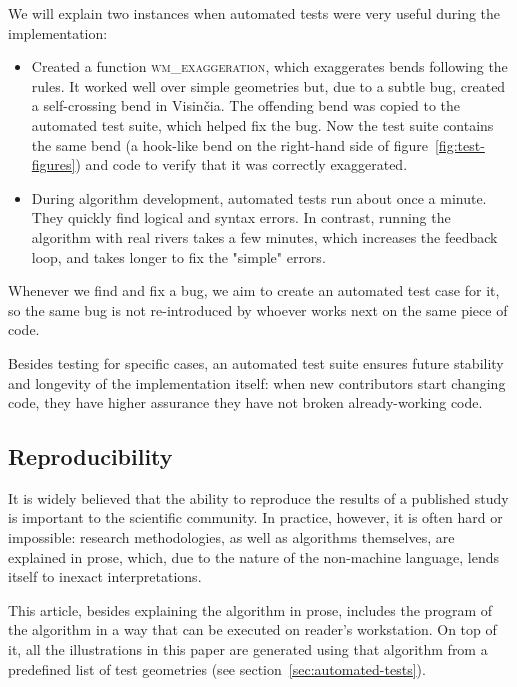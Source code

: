 \documentclass[a4paper]{article}
\begin{document}
We will explain two instances when automated tests were very useful during
the implementation:
\begin{itemize}

    \item Created a function \textsc{wm\_exaggeration}, which exaggerates bends
        following the rules. It worked well over simple geometries but, due to
        a subtle bug, created a self-crossing bend in Visinčia. The offending
        bend was copied to the automated test suite, which helped fix the bug.
        Now the test suite contains the same bend (a hook-like bend on the
        right-hand side of figure~\ref{fig:test-figures}) and code to verify
        that it was correctly exaggerated.

    \item During algorithm development, automated tests run about once a
        minute. They quickly find logical and syntax errors. In contrast,
        running the algorithm with real rivers takes a few minutes, which
        increases the feedback loop, and takes longer to fix the "simple"
        errors.

\end{itemize}

Whenever we find and fix a bug, we aim to create an automated test case for it,
so the same bug is not re-introduced by whoever works next on the same piece of
code.

Besides testing for specific cases, an automated test suite ensures future
stability and longevity of the implementation itself: when new contributors
start changing code, they have higher assurance they have not broken
already-working code.

\subsection{Reproducibility}
\label{sec:reproducing-the-paper}

It is widely believed that the ability to reproduce the results of a published
study is important to the scientific community. In practice, however, it is
often hard or impossible: research methodologies, as well as algorithms
themselves, are explained in prose, which, due to the nature of the non-machine
language, lends itself to inexact interpretations.

This article, besides explaining the algorithm in prose, includes the program
of the algorithm in a way that can be executed on reader's workstation. On top
of it, all the illustrations in this paper are generated using that algorithm
from a predefined list of test geometries (see
section~\ref{sec:automated-tests}).
\end{document}
